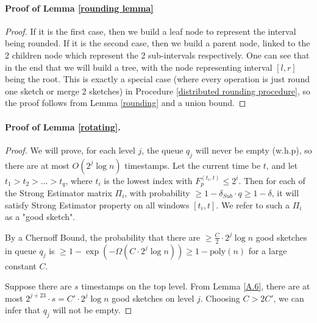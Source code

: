 \documentclass{article}
\newcommand{\est}{\textsf{Strong Estimator }}
\theoremstyle{plain}
\begin{document}
\paragraph{Proof of Lemma \ref{rounding lemma}}


\begin{proof}
If it is the first case, then we build a leaf node to represent the interval being rounded. If it is the second case, then we build a parent node, linked to the 2 children node which represent the 2 sub-intervals respectively. One can see that in the end that we will build a tree, with the node representing interval $[l, r]$ being the root. This is exactly a special case (where every operation is just round one sketch or merge 2 sketches) in Procedure \ref{distributed rounding procedure}, so the proof follows from Lemma \ref{rounding} and a union bound.
\end{proof}


\paragraph{Proof of Lemma \ref{rotating}.}
\begin{proof} 
We will prove, for each level $j$, the queue $q_j$ will never be empty (w.h.p), so there are at most $O(2 ^ j \log n)$ timestamps. Let the current time be $t$, and let $t_1 > t_2 > \dots > t_q$, where $t_i$ is the lowest index with $F_p ^ {(t_i, t)} \le 2 ^ i$. Then for each of the \est matrix $\Pi_i$, with probability $\ge 1 - \delta_{Sub} \cdot q \ge 1 - \delta$, it will satisfy \est property on all windows $[t_i, t]$. We refer to such a $\Pi_i$ as a "good sketch".


By a Chernoff Bound, the probability that there are $\ge \frac C2 \cdot 2 ^ j \log n$ good sketches in queue $q_j$ is $\ge 1 - \exp(-\Omega(C\cdot 2 ^ j \log n)) \ge 1 - \text{poly}(n)$ for a large constant $C$.

Suppose there are $s$ timestamps on the top level. From Lemma \ref {A.6}, there are at most $2 ^ {j+23}\cdot s = C'\cdot 2 ^ j \log n$ good sketches on level $j$. Choosing $C > 2C'$, we can infer that $q_j$ will not be empty. 


\end{proof}
\end{document}
